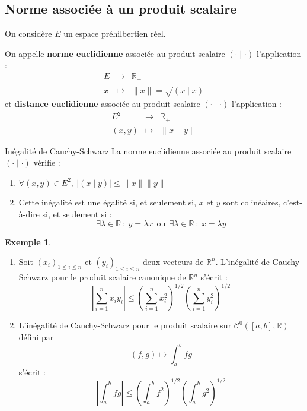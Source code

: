 \documentclass[french]{article}
\newcommand{\R}{\mathbb{R}}
\theoremstyle{plain}
\theoremstyle{definition}
\newtheorem*{ex}{Exemple}
\theoremstyle{remark}
\begin{document}
\subsection{Norme associée à un produit scalaire}

On considère $E$ un espace préhilbertien réel.

\begin{dfn}
	On appelle \textbf{norme euclidienne} associée au produit scalaire $(\cdot\mid\cdot)$ l'application : $$\begin{array}{rcl}
		E&\longrightarrow&\R_+ \\
		x&\longmapsto&\lVert x\rVert=\sqrt{(x\mid x)}
	\end{array}$$ et \textbf{distance euclidienne} associée au produit scalaire $(\cdot\mid\cdot)$ l'application : $$\begin{array}{rcl}
	E^2&\longrightarrow&\R_+ \\
	(x,y)&\longmapsto&\lVert x-y\rVert
	\end{array}$$
\end{dfn}

\begin{thm}{Inégalité de Cauchy-Schwarz}
	La norme euclidienne associée au produit scalaire $(\cdot\mid\cdot)$ vérifie : 
	\begin{enumerate}
		\item $\forall (x,y)\in E^2,\ \lvert (x\mid y)\rvert\leqslant\lVert x\rVert\lVert y\rVert$
		\item Cette inégalité est une égalité si, et seulement si, $x$ et $y$ sont colinéaires, c'est-à-dire si, et seulement si : $$\exists\lambda\in\R\ : \ y=\lambda x\ \ \text{ou}\ \ \exists\lambda\in\R\ : \ x=\lambda y$$
	\end{enumerate}
\end{thm}

\begin{ex}
	\begin{enumerate}
		\item Soit $(x_i)_{1\leqslant i\leqslant n}$ et $(y_i)_{1\leqslant i\leqslant n}$ deux vecteurs de $\R^n$. L'inégalité de Cauchy-Schwarz pour le produit scalaire canonique de $\R^n$ s'écrit : $$\left\lvert\sum_{i=1}^{n}x_iy_i\right\rvert\leqslant\left(\sum_{i=1}^{n}x_i^2\right)^{1/2}\left(\sum_{i=1}^{n}y_i^2\right)^{1/2}$$
		\item L'inégalité de Cauchy-Schwarz pour le produit scalaire sur $\mathcal{C}^0([a,b],\R)$ défini par $$(f,g)\mapsto\int_{a}^{b}fg$$ s'écrit : $$\left\lvert \int_{a}^{b}fg\right\rvert\leqslant\left(\int_{a}^{b}f^2\right)^{1/2}\left(\int_{a}^{b}g^2\right)^{1/2}$$
	\end{enumerate}
\end{ex}
\end{document}
